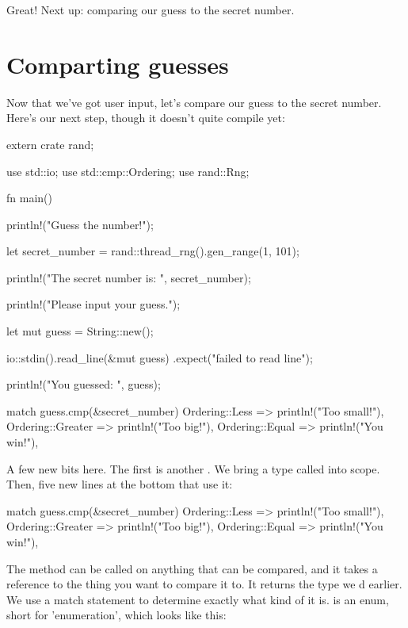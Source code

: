 Great! Next up: comparing our guess to the secret number.

\section{Comparting guesses}

Now that we've got user input, let's compare our guess to the secret number. Here's our next step, though it doesn't quite 
compile yet:

\begin{rustc}
extern crate rand;

use std::io;
use std::cmp::Ordering;
use rand::Rng;

fn main() {
    println!("Guess the number!");

    let secret_number = rand::thread_rng().gen_range(1, 101);

    println!("The secret number is: {}", secret_number);

    println!("Please input your guess.");

    let mut guess = String::new();

    io::stdin().read_line(&mut guess)
        .expect("failed to read line");

    println!("You guessed: {}", guess);

    match guess.cmp(&secret_number) {
        Ordering::Less    => println!("Too small!"),
        Ordering::Greater => println!("Too big!"),
        Ordering::Equal   => println!("You win!"),
    }
}
\end{rustc}

A few new bits here. The first is another . We bring a type called  into scope. Then, five 
new lines at the bottom that use it:

\begin{rustc}
match guess.cmp(&secret_number) {
    Ordering::Less    => println!("Too small!"),
    Ordering::Greater => println!("Too big!"),
    Ordering::Equal   => println!("You win!"),
}
\end{rustc}

The  method can be called on anything that can be compared, and it takes a reference to the thing you want to compare 
it to. It returns the  type we d earlier. We use a match statement to determine exactly what kind of 
 it is.  is an enum, short for 'enumeration', which looks like this:

